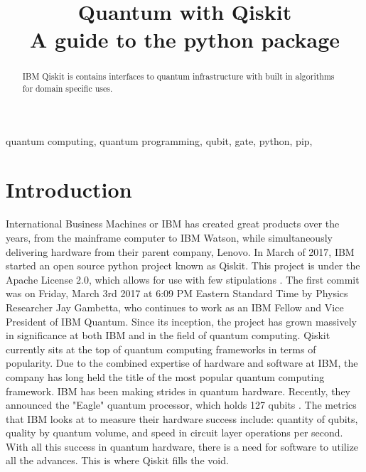 \documentclass[conference]{IEEEtran}
\begin{document}
\title{ Quantum with Qiskit \\
{\footnotesize A guide to the python package}
}

\author{
}

\maketitle

\begin{abstract}
IBM Qiskit is contains interfaces to quantum infrastructure with built in algorithms for domain specific uses.
\end{abstract}

\begin{IEEEkeywords}
quantum computing, quantum programming, qubit, gate, python, pip, 
\end{IEEEkeywords}

\section{Introduction}
International Business Machines or IBM has created great products over the years, from the mainframe computer to IBM Watson, while simultaneously delivering hardware from their parent company, Lenovo. 
In March of 2017, IBM started an open source python project known as Qiskit.
This project is under the Apache License 2.0, which allows for use with few stipulations \cite{b1}.
The first commit was on Friday, March 3rd 2017 at 6:09 PM Eastern Standard Time by Physics Researcher Jay Gambetta, who continues to work as an IBM Fellow and Vice President of IBM Quantum.
Since its inception, the project has grown massively in significance at both IBM and in the field of quantum computing. 
Qiskit currently sits at the top of quantum computing frameworks in terms of popularity. 
Due to the combined expertise of hardware and software at IBM, the company has long held the title of the most popular quantum computing framework.
IBM has been making strides in quantum hardware.
Recently, they announced the "Eagle" quantum processor, which holds 127 qubits \cite{b2}.
The metrics that IBM looks at to measure their hardware success include: quantity of qubits, quality by quantum volume, and speed in circuit layer operations per second.
With all this success in quantum hardware, there is a need for software to utilize all the advances.
This is where Qiskit fills the void. 
\end{document}
